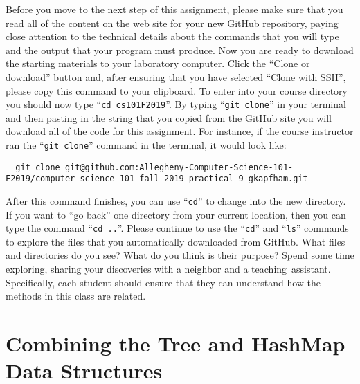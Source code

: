 \documentclass[11pt]{article}
\newcommand{\command}[1]{``\lstinline{#1}''}
\newcommand{\step}[1]{``{#1}''}
\begin{document}

Before you move to the next step of this assignment, please make sure that you
read all of the content on the web site for your new GitHub repository, paying
close attention to the technical details about the commands that you will type
and the output that your program must produce. Now you are ready to download the
starting materials to your laboratory computer. Click the ``Clone or download''
button and, after ensuring that you have selected ``Clone with SSH'', please
copy this command to your clipboard. To enter into your course directory you
should now type \command{cd cs101F2019}. By typing \command{git clone} in your
terminal and then pasting in the string that you copied from the GitHub site you
will download all of the code for this assignment. For instance, if the course
instructor ran the \command{git clone} command in the terminal, it would look
like:

\begin{lstlisting}
  git clone git@github.com:Allegheny-Computer-Science-101-F2019/computer-science-101-fall-2019-practical-9-gkapfham.git
\end{lstlisting}

After this command finishes, you can use \command{cd} to change into the new
directory. If you want to \step{go back} one directory from your current
location, then you can type the command \command{cd ..}. Please continue to use
the \command{cd} and \command{ls} commands to explore the files that you
automatically downloaded from GitHub. What files and directories do you see?
What do you think is their purpose? Spend some time exploring, sharing your
discoveries with a neighbor and a \mbox{teaching assistant}.
Specifically, each student should ensure that they can understand how the
methods in this class are related.

\section*{Combining the Tree and HashMap Data Structures}
\end{document}
